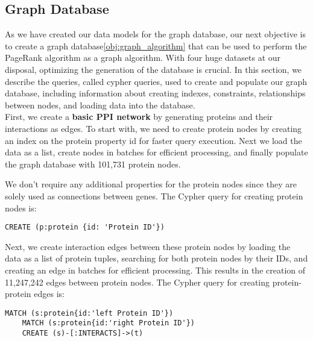 \subsection{Graph Database} \label{subsec:graph_database}

As we have created our data models for the graph database, our next objective is to create a graph database\ref{obj:graph_algorithm}
that can be used to perform the PageRank algorithm as a graph algorithm.
With four huge datasets at our disposal, optimizing the generation of the database is crucial.
In this section, we describe the queries, called cypher queries, used to create and populate our graph database,
including information about creating indexes, constraints, relationships between nodes, and loading data into the database.\\


First, we create a \textbf{basic PPI network} by generating proteins and their interactions as edges.
To start with, we need to create protein nodes by creating an index on the protein property id for faster query execution.
Next we load the data as a list, create nodes in batches for efficient processing,
and finally populate the graph database with 101,731 protein nodes.

We don't require any additional properties for the protein nodes since they are solely used as connections between genes.
The Cypher query for creating protein nodes is:

\begin{lstlisting}[language=Cypher, label={lst:protein_nodes}]
    CREATE (p:protein {id: 'Protein ID'})
\end{lstlisting}

Next, we create interaction edges between these protein nodes by loading the data as a list of protein tuples,
searching for both protein nodes by their IDs, and creating an edge in batches for efficient processing.
This results in the creation of 11,247,242 edges between protein nodes.
The Cypher query for creating protein-protein edges is:

\begin{lstlisting}[language=Cypher, label={lst:protein_edges}]
    MATCH (s:protein{id:'left Protein ID'})
    MATCH (s:protein{id:'right Protein ID'})
    CREATE (s)-[:INTERACTS]->(t)
\end{lstlisting}

